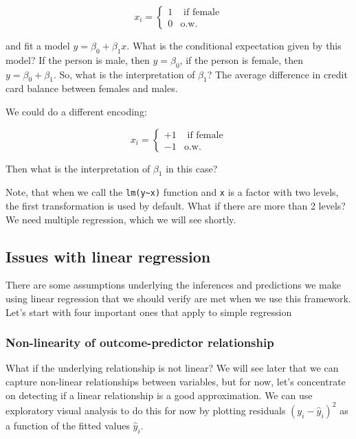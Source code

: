 \documentclass[]{article}
\theoremstyle{definition}
\theoremstyle{definition}
\theoremstyle{remark}
\begin{document}
\[
x_i = \left\{
\begin{align}
1 & \textrm{ if female} \\
0 & \textrm{o.w.}
\end{align}
\right.
\]

and fit a model \(y = \beta_0 + \beta_1 x\). What is the conditional
expectation given by this model? If the person is male, then
\(y=\beta_0\), if the person is female, then \(y=\beta_0 + \beta_1\).
So, what is the interpretation of \(\beta_1\)? The average difference in
credit card balance between females and males.

We could do a different encoding:

\[
x_i = \left\{
\begin{align}
+1 & \textrm{ if female} \\
-1 & \textrm{o.w.}
\end{align}
\right.
\]

Then what is the interpretation of \(\beta_1\) in this case?

Note, that when we call the \texttt{lm(y\textasciitilde{}x)} function
and \texttt{x} is a factor with two levels, the first transformation is
used by default. What if there are more than 2 levels? We need multiple
regression, which we will see shortly.

\subsection{Issues with linear
regression}\label{issues-with-linear-regression}

There are some assumptions underlying the inferences and predictions we
make using linear regression that we should verify are met when we use
this framework. Let's start with four important ones that apply to
simple regression

\subsubsection{Non-linearity of outcome-predictor
relationship}\label{non-linearity-of-outcome-predictor-relationship}

What if the underlying relationship is not linear? We will see later
that we can capture non-linear relationships between variables, but for
now, let's concentrate on detecting if a linear relationship is a good
approximation. We can use exploratory visual analysis to do this for now
by plotting residuals \((y_i - \hat{y}_i)^2\) as a function of the
fitted values \(\hat{y}_i\).
\end{document}
